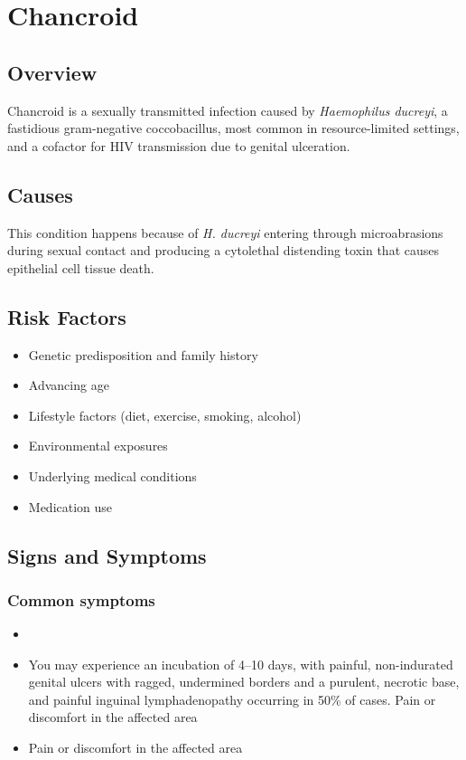 \chapter{Chancroid}
\label{sec:Chancroid}

\section{Overview}
Chancroid is a sexually transmitted infection caused by \textit{Haemophilus ducreyi}, a fastidious gram-negative coccobacillus, most common in resource-limited settings, and a cofactor for HIV transmission due to genital ulceration.
\section{Causes}
This condition happens because of \textit{H. ducreyi} entering through microabrasions during sexual contact and producing a cytolethal distending toxin that causes epithelial cell tissue death.     
\section{Risk Factors}

\begin{itemize}[noitemsep]
  \item Genetic predisposition and family history
  \item Advancing age
  \item Lifestyle factors (diet, exercise, smoking, alcohol)
  \item Environmental exposures
  \item Underlying medical conditions
  \item Medication use
\end{itemize}
\section{Signs and Symptoms}

\subsection{Common symptoms}
\begin{itemize}[noitemsep]
  \item \item You may experience an incubation of 4--10 days, with painful, non-indurated genital ulcers with ragged, undermined borders and a purulent, necrotic base, and painful inguinal lymphadenopathy occurring in 50\% of cases. Pain or discomfort in the affected area    \item Pain or discomfort in the affected area
  \end{itemize}

